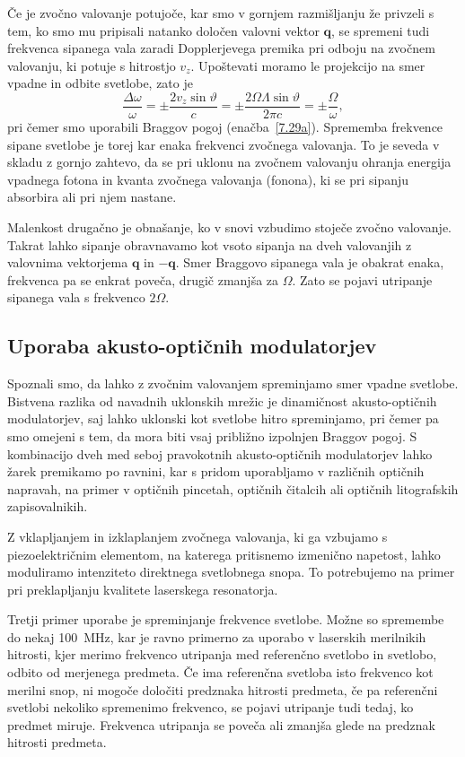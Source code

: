 Če je zvočno valovanje potujoče, kar smo v gornjem razmišljanju že privzeli
s tem, ko smo mu pripisali natanko določen valovni vektor $\mathbf{q}$,
se spremeni tudi frekvenca sipanega vala zaradi Dopplerjevega premika
pri odboju na zvočnem valovanju, ki potuje s hitrostjo $v_{z}$. Upoštevati
moramo le projekcijo na smer vpadne in odbite svetlobe, zato je 
\begin{equation}
\frac{\Delta\omega}{\omega}=\pm\frac{2v_{z}\sin\vartheta}{c}=
\pm\frac{2\Omega\Lambda\sin\vartheta}{2 \pi c}=\pm\frac{\Omega}{\omega},
\label{7.32}
\end{equation}
pri čemer smo uporabili Braggov pogoj (enačba~\ref{7.29a}). Sprememba frekvence
sipane svetlobe je torej kar enaka frekvenci zvočnega valovanja. To je seveda v skladu 
z gornjo zahtevo, da se pri uklonu na zvočnem valovanju ohranja energija
vpadnega fotona in kvanta zvočnega valovanja (fonona), ki se pri sipanju 
absorbira ali pri njem nastane.

Malenkost drugačno je obnašanje, ko v snovi vzbudimo stoječe zvočno valovanje. 
Takrat lahko sipanje obravnavamo kot vsoto sipanja na dveh valovanjih z valovnima 
vektorjema $\mathbf{q}$ in $-\mathbf{q}$. Smer Braggovo sipanega vala je obakrat enaka, 
frekvenca pa se enkrat poveča, drugič zmanjša za $\Omega$. Zato se pojavi utripanje
sipanega vala s frekvenco $2\Omega$.

\subsection*{Uporaba akusto-optičnih modulatorjev}
Spoznali smo, da lahko z zvočnim valovanjem spreminjamo smer vpadne svetlobe.
Bistvena razlika od navadnih uklonskih mrežic je dinamičnost akusto-optičnih modulatorjev, 
saj lahko uklonski kot svetlobe hitro spreminjamo, pri čemer pa smo omejeni s 
tem, da mora biti vsaj približno izpolnjen Braggov pogoj. S kombinacijo dveh med seboj 
pravokotnih akusto-optičnih modulatorjev lahko žarek 
premikamo po ravnini, kar s pridom uporabljamo v različnih optičnih napravah, 
na primer v optičnih pincetah, optičnih čitalcih ali 
optičnih litografskih zapisovalnikih.

Z vklapljanjem in izklaplanjem zvočnega valovanja, ki ga vzbujamo s piezoelektričnim elementom,
na katerega pritisnemo izmenično napetost, lahko moduliramo intenziteto
direktnega svetlobnega snopa. To potrebujemo na primer pri preklapljanju
kvalitete laserskega resonatorja.

Tretji primer uporabe je spreminjanje frekvence svetlobe. Možne so spremembe
do nekaj 100~MHz, kar je ravno primerno za uporabo v laserskih merilnikih
hitrosti, kjer merimo frekvenco utripanja med referenčno svetlobo in svetlobo, odbito od
merjenega predmeta. Če ima referenčna svetloba
isto frekvenco kot merilni snop, ni mogoče določiti predznaka hitrosti
predmeta, če pa referenčni svetlobi nekoliko spremenimo frekvenco,
se pojavi utripanje tudi tedaj, ko predmet miruje. Frekvenca utripanja
se poveča ali zmanjša glede na predznak hitrosti predmeta.

